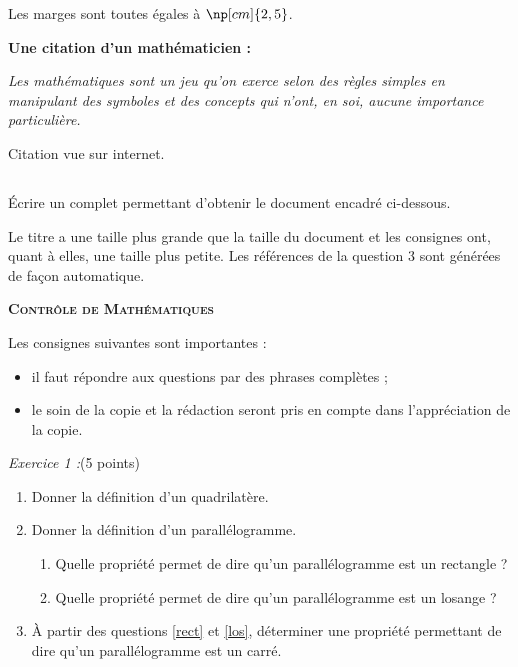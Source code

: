 \documentclass[10pt,french]{book}
\begin{document}
Les marges sont toutes égales à $\np[cm]{2,5}$.\bigskip

\begin{CadreExemple}
    \begin{center}
        \color{blue}\bfseries Une citation d'un mathématicien : 
    \end{center}\medskip

    {\itshape Les mathématiques sont un jeu qu'on exerce selon des règles simples en manipulant des symboles et des concepts qui n'ont, en soi, aucune importance particulière.}\bigskip

    \begin{flushright}
        Citation vue sur internet.
    \end{flushright}
\end{CadreExemple}\bigskip

\subsection*{\ExoFiche}

\'Ecrire un  complet permettant d'obtenir le document encadré ci-dessous.\par
Le titre a une taille plus grande que la taille du document et les consignes ont, quant à elles, une taille plus petite. Les références de la question 3 sont générées de façon automatique.\bigskip

\begin{CadreExemple}
\reset
\begin{center}
    \scshape\bfseries\Large Contrôle de Mathématiques
\end{center}\bigskip

{\small
Les consignes suivantes sont importantes :
\begin{itemize}
    \item il faut répondre aux questions par des phrases complètes ;
    \item le soin de la copie et la rédaction seront pris en compte dans l'appréciation de la copie.
\end{itemize}}\bigskip

\textit{Exercice 1 :}\hfill (5 points)

\begin{enumerate}
    \item Donner la définition d'un quadrilatère.
    \item Donner la définition d'un parallélogramme.
        \begin{enumerate}
            \item Quelle propriété permet de dire qu'un parallélogramme est un rectangle ?\label{rect}
            \item Quelle propriété permet de dire qu'un parallélogramme est un losange ?\label{los}
        \end{enumerate}
    \item À partir des questions \ref{rect} et \ref{los}, déterminer une propriété permettant de dire qu'un parallélogramme est un carré.
\end{enumerate}
\end{CadreExemple}
\end{document}
